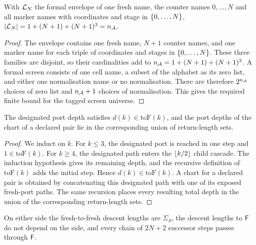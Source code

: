 \begin{lemma}
\label{thm:composite-universe}
\leanok
{}
With $\mathcal{L}_N$ the formal envelope of one fresh name, the counter names $0,\dots,N$ and all marker
names with coordinates and stage in $\{0,\dots,N\}$,
$\lvert \mathcal{L}_N \rvert=1+(N+1)+(N+1)^3=n_{\mathcal{A}}$.
\end{lemma}

\begin{proof}
\leanok
{}
The envelope contains one fresh name, $N+1$ counter names, and one marker name for each triple of
coordinates and stages in $\{0,\dots,N\}$. These three families are disjoint, so their
cardinalities add to $n_{\mathcal{A}}=1+(N+1)+(N+1)^3$. A formal screen consists of one cell name, a
subset of the alphabet as its zero list, and either one normalisation name or no normalisation.
There are therefore $2^{n_{\mathcal{A}}}$ choices of zero list and $n_{\mathcal{A}}+1$ choices of
normalisation. This gives the required finite bound for the tagged screen universe.
\end{proof}

\begin{lemma}
\label{thm:chart-returns}
\leanok
{}
The designated port depth satisfies $d(k)\in\mathrm{toF}(k)$, and the port depths of the chart of
a declared pair lie in the corresponding union of return-length sets.
\end{lemma}

\begin{proof}
\leanok
{}
We induct on $k$. For $k\leq3$, the designated port is reached in one step and
$1\in\mathrm{toF}(k)$. For $k\geq4$, the designated path enters the
$\lfloor k/2 \rfloor$ child cascade. The induction hypothesis gives its remaining depth, and the recursive
definition of $\mathrm{toF}(k)$ adds the initial step. Hence $d(k)\in\mathrm{toF}(k)$. A chart
for a declared pair is obtained by concatenating this designated path with one of its exposed
fresh-port paths. The same recursion places every resulting total depth in the union of the
corresponding return-length sets.
\end{proof}

\begin{lemma}[Realisation]
\label{thm:composite-realise}
\leanok
On either side the fresh-to-fresh descent lengths are $\Sigma_S$, the descent lengths to $\mathsf{F}$
do not depend on the side, and every chain of $2N+2$ successor steps passes through $\mathsf{F}$.
\end{lemma}

